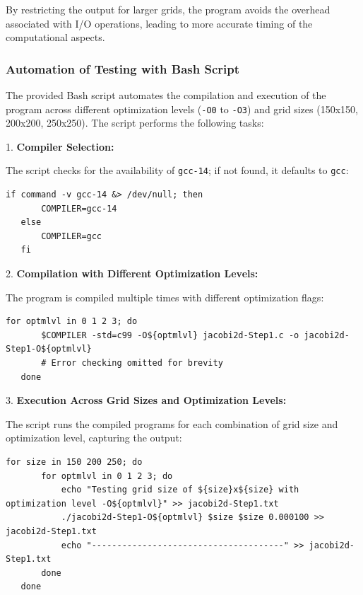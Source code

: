 \documentclass{article}
\begin{document}
By restricting the output for larger grids, the program avoids the overhead associated with I/O operations, leading to more accurate timing of the computational aspects.

\subsubsection{Automation of Testing with Bash Script}

The provided Bash script automates the compilation and execution of the program across different optimization levels (\texttt{-O0} to \texttt{-O3}) and grid sizes (150x150, 200x200, 250x250). The script performs the following tasks:

1. \textbf{Compiler Selection:}

   The script checks for the availability of \texttt{gcc-14}; if not found, it defaults to \texttt{gcc}:

   \begin{lstlisting}[style=CStyle, caption={Setting Boundary Conditions}]
   if command -v gcc-14 &> /dev/null; then
       COMPILER=gcc-14
   else
       COMPILER=gcc
   fi
   \end{lstlisting}

2. \textbf{Compilation with Different Optimization Levels:}

   The program is compiled multiple times with different optimization flags:

   \begin{lstlisting}[style=CStyle, caption={Setting Boundary Conditions}]
   for optmlvl in 0 1 2 3; do
       $COMPILER -std=c99 -O${optmlvl} jacobi2d-Step1.c -o jacobi2d-Step1-O${optmlvl}
       # Error checking omitted for brevity
   done
   \end{lstlisting}

3. \textbf{Execution Across Grid Sizes and Optimization Levels:}

   The script runs the compiled programs for each combination of grid size and optimization level, capturing the output:

   \begin{lstlisting}[style=CStyle, caption={Setting Boundary Conditions}]
   for size in 150 200 250; do
       for optmlvl in 0 1 2 3; do
           echo "Testing grid size of ${size}x${size} with optimization level -O${optmlvl}" >> jacobi2d-Step1.txt
           ./jacobi2d-Step1-O${optmlvl} $size $size 0.000100 >> jacobi2d-Step1.txt
           echo "--------------------------------------" >> jacobi2d-Step1.txt
       done
   done
    \end{lstlisting}
\end{document}
